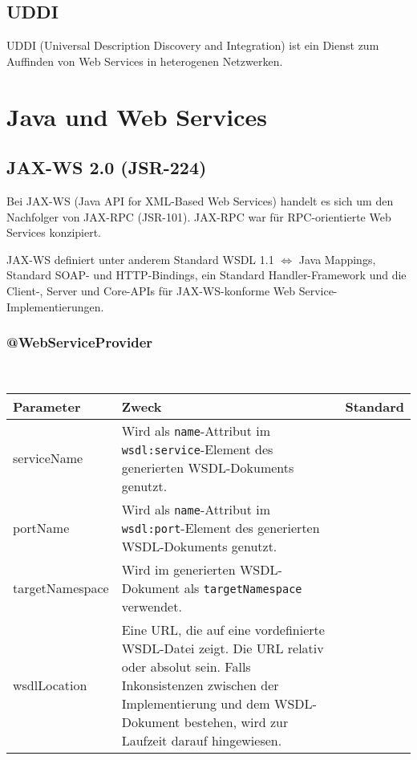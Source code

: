 \documentclass[runningheads]{llncs}
\newcommand{\germanquote}[1]{\glqq{}#1\grqq{}}
\newcommand{\anntabwidth}{\textwidth}
\begin{document}
  \label{uddi}
  \subsection{UDDI}
    UDDI\cite{wk_uddi} (Universal Description Discovery and Integration) ist ein Dienst zum Auffinden von Web Services in heterogenen Netzwerken.


  \label{wsj}
  \section{Java und Web Services}

  \label{jsr224}
  \subsection{JAX-WS 2.0 (JSR-224)}
    Bei JAX-WS\cite{jsr_224} (Java API for XML-Based Web Services) handelt es sich um den Nachfolger von JAX-RPC (JSR-101). JAX-RPC war für RPC-orientierte Web Services konzipiert.

    JAX-WS definiert unter anderem Standard WSDL 1.1 $\Leftrightarrow$ Java Mappings, Standard SOAP- und HTTP-Bindings, ein Standard Handler-Framework und die Client-, Server und Core-APIs für JAX-WS-konforme Web Service-Im\-ple\-men\-tier\-ung\-en.

    \subsubsection{@WebServiceProvider}\ \\
    \tymin=75pt
    \begin{tabulary}{\anntabwidth}{|l|L|L|}
    \hline
    \textbf{Parameter} & \textbf{Zweck} & \textbf{Standard} \\
    \hline
      serviceName &
      Wird als \texttt{name}-Attribut im \texttt{wsdl:service}-Element des generierten WSDL-\linebreak[0]Dokuments genutzt. &
      \germanquote{} \\
    \hline
      portName &
      Wird als \texttt{name}-Attribut im \texttt{wsdl:port}-Element des generierten WSDL-\linebreak[0]Dokuments genutzt. &
      \germanquote{} \\
    \hline
      targetNamespace &
      Wird im generierten WSDL-Dokument als \texttt{targetNamespace} verwendet. &
      \germanquote{} \\
    \hline
      wsdlLocation &
      Eine URL, die auf eine vordefinierte WSDL-Datei zeigt. Die URL relativ oder absolut sein. Falls Inkonsistenzen zwischen der Implementierung und dem WSDL-Dokument bestehen, wird zur Laufzeit darauf hingewiesen. &
      \germanquote{} \\
    \hline
    \end{tabulary}
    \tymin=10pt
\end{document}
